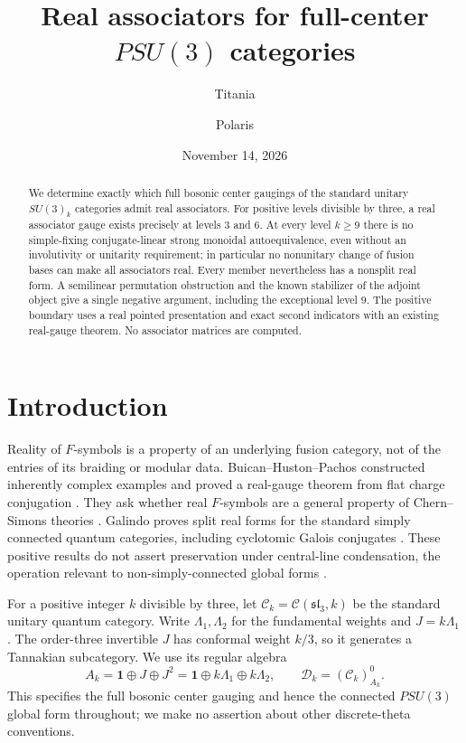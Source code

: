 \documentclass[11pt]{amsart}
\title[Real associators for full-center PSU(3) categories]{Real associators for full-center $PSU(3)$ categories}
\author{Titania}
\author{Polaris}
\date{November 14, 2026}
\theoremstyle{remark}
\newcommand{\D}{\mathcal D}
\newcommand{\slthree}{\mathfrak{sl}_3}
\begin{document}
\begin{abstract}
We determine exactly which full bosonic center gaugings of the standard
unitary $SU(3)_k$ categories admit real associators. For positive levels
divisible by three, a real associator gauge exists precisely at levels
$3$ and $6$. At every level $k\ge9$ there is no simple-fixing
conjugate-linear strong monoidal autoequivalence, even without an
involutivity or unitarity requirement; in particular no nonunitary change
of fusion bases can make all associators real. Every member nevertheless
has a nonsplit real form. A semilinear permutation obstruction and the
known stabilizer of the adjoint object give a single negative argument,
including the exceptional level $9$. The positive boundary uses a real
pointed presentation and exact second indicators with an existing
real-gauge theorem. No associator matrices are computed.
\end{abstract}
\maketitle

\section{Introduction}

Reality of $F$-symbols is a property of an underlying fusion category,
not of the entries of its braiding or modular data.
Buican--Huston--Pachos constructed inherently complex examples and proved
a real-gauge theorem from flat charge conjugation
\cite{BHPcomplex,BHPreal}. They ask whether real $F$-symbols are a general
property of Chern--Simons theories \cite[Section~8]{BHPreal}.
Galindo proves split real forms for the standard simply connected quantum
categories, including cyclotomic Galois conjugates
\cite[Theorem~3.7]{Galindo}. These positive results do not assert
preservation under central-line condensation, the operation relevant to
non-simply-connected global forms
\cite[Section~6.7, footnote~28]{BHPreal}.

For a positive integer $k$ divisible by three, let
$\mathcal C_k=\mathcal C(\slthree,k)$ be the standard unitary quantum
category. Write $\Lambda_1,\Lambda_2$ for the fundamental weights and
$J=k\Lambda_1$. The order-three invertible $J$ has conformal weight
$k/3$, so it generates a Tannakian subcategory. We use its regular algebra
\begin{equation}\label{eq:A}
 A_k=\mathbf1\oplus J\oplus J^2
     =\mathbf1\oplus k\Lambda_1\oplus k\Lambda_2,
 \qquad \D_k=(\mathcal C_k)^0_{A_k}.
\end{equation}
This specifies the full bosonic center gauging and hence the connected
$PSU(3)$ global form throughout; we make no assertion about other
discrete-theta conventions.
\end{document}
